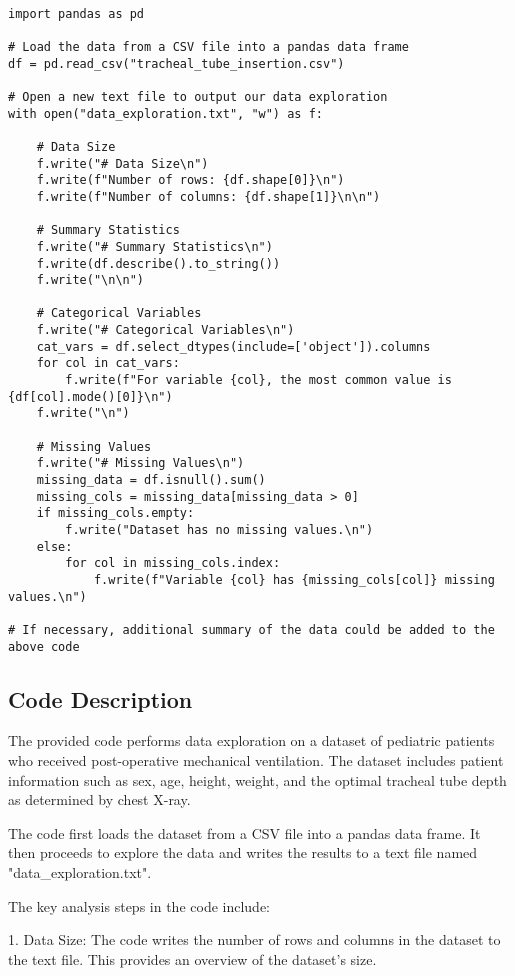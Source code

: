 \documentclass[11pt]{article}
\begin{document}
\begin{verbatim}

import pandas as pd

# Load the data from a CSV file into a pandas data frame
df = pd.read_csv("tracheal_tube_insertion.csv")

# Open a new text file to output our data exploration
with open("data_exploration.txt", "w") as f:
    
    # Data Size
    f.write("# Data Size\n")
    f.write(f"Number of rows: {df.shape[0]}\n")
    f.write(f"Number of columns: {df.shape[1]}\n\n")

    # Summary Statistics
    f.write("# Summary Statistics\n")
    f.write(df.describe().to_string())
    f.write("\n\n")

    # Categorical Variables
    f.write("# Categorical Variables\n")
    cat_vars = df.select_dtypes(include=['object']).columns
    for col in cat_vars:
        f.write(f"For variable {col}, the most common value is {df[col].mode()[0]}\n")
    f.write("\n")

    # Missing Values
    f.write("# Missing Values\n")
    missing_data = df.isnull().sum()
    missing_cols = missing_data[missing_data > 0]
    if missing_cols.empty:
        f.write("Dataset has no missing values.\n")
    else:
        for col in missing_cols.index:
            f.write(f"Variable {col} has {missing_cols[col]} missing values.\n")

# If necessary, additional summary of the data could be added to the above code

\end{verbatim}

\subsection{Code Description}

The provided code performs data exploration on a dataset of pediatric patients who received post-operative mechanical ventilation. The dataset includes patient information such as sex, age, height, weight, and the optimal tracheal tube depth as determined by chest X-ray.

The code first loads the dataset from a CSV file into a pandas data frame. It then proceeds to explore the data and writes the results to a text file named "data\_exploration.txt".

The key analysis steps in the code include:

1. Data Size: The code writes the number of rows and columns in the dataset to the text file. This provides an overview of the dataset's size.
\end{document}
